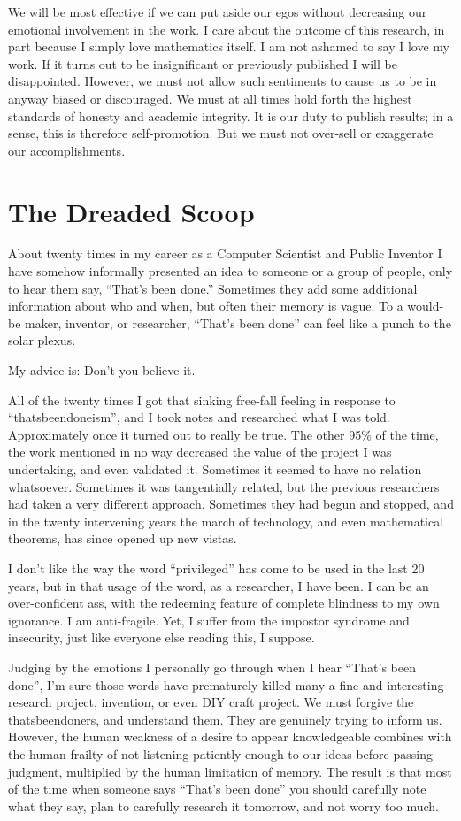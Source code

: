 \documentclass[
	fontsize=10pt, %
	twoside=false, %
	secnumdepth=1, %
]{kaobook}
\begin{document}
We will be most effective if we can put aside our egos
without decreasing our emotional involvement in the work.
I care about the outcome of this research, in part because
I simply love mathematics itself.
I am not ashamed to say I love my work. If it turns out
to be insignificant or previously published I will be disappointed.
However, we must not allow such sentiments to cause
us to be in anyway biased or discouraged.
We must at all times hold forth the highest standards
of honesty and academic integrity.
It is our duty to publish results; in a sense,
this is therefore self-promotion.
But we must not over-sell or exaggerate our accomplishments.

\section{The Dreaded Scoop}

About twenty times in my career as a Computer Scientist and Public
Inventor I have somehow informally presented an idea to someone or a
group of people, only to hear them say, “That’s been done.”  Sometimes
they add some additional information about who and when, but often
their memory is vague.  To a would-be maker, inventor, or researcher,
“That’s been done” can feel like a punch to the solar plexus.

My advice is: Don’t you believe it.

All of the twenty times I got that sinking free-fall feeling in
response to “thatsbeendoneism”, and I took notes and researched what I
was told. Approximately once it turned out to really be true.  The
other 95\% of the time, the work mentioned in no way decreased the
value of the project I was undertaking, and even validated
it. Sometimes it seemed to have no relation whatsoever. Sometimes it
was tangentially related, but the previous researchers had taken a
very different approach. Sometimes they had begun and stopped, and in
the twenty intervening years the march of technology, and even
mathematical theorems, has since opened up new vistas.

I don’t like the way the word “privileged” has come to be used in the
last 20 years, but in that usage of the word, as a researcher, I have
been. I can be an over-confident ass, with the redeeming feature of
complete blindness to my own ignorance. I am anti-fragile. Yet, I
suffer from the impostor syndrome and insecurity, just like everyone
else reading this, I suppose.

Judging by the emotions I personally go through when I hear “That’s
been done”, I’m sure those words have prematurely killed many a fine
and interesting research project, invention, or even DIY craft
project.  We must forgive the thatsbeendoners, and understand
them. They are genuinely trying to inform us. However, the human
weakness of a desire to appear knowledgeable combines with the human
frailty of not listening patiently enough to our ideas before passing
judgment, multiplied by the human limitation of memory. The result is
that most of the time when someone says “That’s been done” you should
carefully note what they say, plan to carefully research it tomorrow,
and not worry too much.
\end{document}
